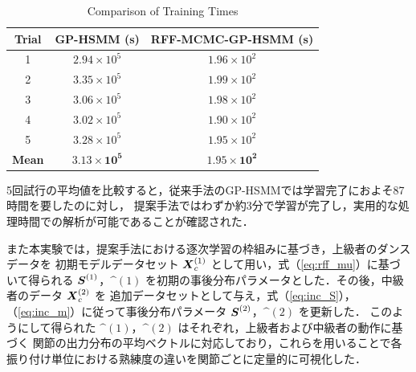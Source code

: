 \documentclass[conference]{IEEEtran}
\begin{document}
\begin{table}[t]
  \centering
  \caption{Comparison of Training Times}
  \label{tab:training_time}
  \begin{tabular}{ccc}
    \hline
    \textbf{Trial} & \textbf{GP-HSMM (s)} & \textbf{RFF-MCMC-GP-HSMM (s)} \\
    \hline
    1 & $2.94 \times 10^5$ & $1.96 \times 10^2$ \\
    2 & $3.35 \times 10^5$ & $1.99 \times 10^2$ \\
    3 & $3.06 \times 10^5$ & $1.98 \times 10^2$ \\
    4 & $3.02 \times 10^5$ & $1.90 \times 10^2$ \\
    5 & $3.28 \times 10^5$ & $1.95 \times 10^2$ \\
    \hline
    \textbf{Mean} & $\mathbf{3.13 \times 10^5}$ & $\mathbf{1.95 \times 10^2}$ \\
    \hline
  \end{tabular}
\end{table}


5回試行の平均値を比較すると，従来手法のGP-HSMMでは学習完了におよそ87時間を要したのに対し，
提案手法ではわずか約3分で学習が完了し，実用的な処理時間での解析が可能であることが確認された．

また本実験では，提案手法における逐次学習の枠組みに基づき，上級者のダンスデータを
初期モデルデータセット ${ \boldsymbol X}_c^{(1)}$ として用い，式（\ref{eq:rff_mu}）に基づいて得られる
${ \boldsymbol S}^{(1)}$，$\bm^{(1)}$ を初期の事後分布パラメータとした．その後，中級者のデータ ${ \boldsymbol X}_c^{(2)}$ を
追加データセットとして与え，式（\ref{eq:inc_S}），（\ref{eq:inc_m}）に従って事後分布パラメータ ${ \boldsymbol S}^{(2)}$，$\bm^{(2)}$ を更新した．
このようにして得られた $\bm^{(1)}$，$\bm^{(2)}$ はそれぞれ，上級者および中級者の動作に基づく
関節の出力分布の平均ベクトルに対応しており，これらを用いることで各振り付け単位における熟練度の違いを関節ごとに定量的に可視化した．
\end{document}
